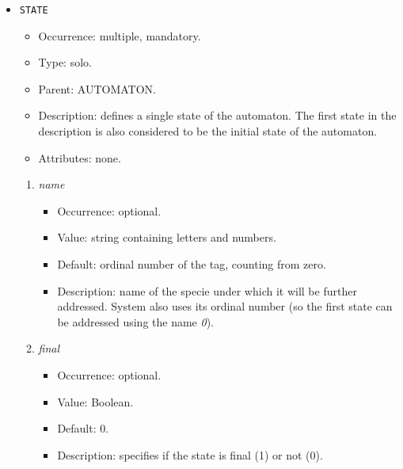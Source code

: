 \documentclass[12pt]{article}
\newenvironment{menum}{
\begin{enumerate}
  \setlength{\itemsep}{0pt}
  \setlength{\parskip}{0pt}
  \setlength{\parsep}{0pt}
}{\end{enumerate}}
\newenvironment{mitem}{
\begin{itemize}
  \setlength{\itemsep}{0pt}
  \setlength{\parskip}{0pt}
  \setlength{\parsep}{0pt}
}{\end{itemize}}
\begin{document}
\begin{mitem}
	\item \texttt{STATE}
	\begin{mitem}
		\item Occurrence: multiple, mandatory.
		\item Type: solo.
		\item Parent: AUTOMATON.
		\item Description: defines a single state of the automaton. The first state in the description is also considered to be the initial state of the automaton.
		\item Attributes: none.
	\end{mitem}
		\begin{menum}
			\item \textit{name} 
			\begin{mitem}
				\item Occurrence: optional.
				\item Value: string containing letters and numbers.
				\item Default: ordinal number of the tag, counting from zero.
				\item Description: name of the specie under which it will be further addressed. System also uses its ordinal number (so the first state can be addressed using the name \emph{0}).
			\end{mitem}
			\item \textit{final} 
			\begin{mitem}
				\item Occurrence: optional.
				\item Value: Boolean.
				\item Default: 0.
				\item Description: specifies if the state is final (1) or not (0).
			\end{mitem}
		\end{menum}
\end{mitem}		
\end{document}
